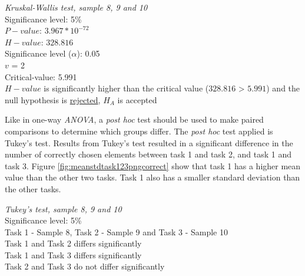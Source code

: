  \begin{center}
	\begin{tcolorbox}[width=0.8\textwidth]
		\centering
		\textit{Kruskal-Wallis test, sample 8, 9 and 10}\\
		Significance level: 5\%  \\[0.5cm]
		
		$P-value$: $3.967* 10^{-72}$ \\
		$H-value$: $328.816$ \\
		Significance level ($\alpha$): 0.05 \\
		$v$ = 2\\ %
		Critical-value:  5.991\\[0.2cm] %
		
		$H-value$ is significantly higher than the critical value ($328.816$ > $5.991$) and the null hypothesis is \underline{rejected}, $H_A$ is accepted\\[0.5cm]
	\end{tcolorbox} 
\end{center}
\vspace{0.3cm}

Like in one-way \textit{ANOVA}, a \textit{post hoc} test should be used to make paired comparisons to determine which groups differ. The \textit{post hoc} test applied is Tukey's test. Results from Tukey's test resulted in a significant difference in the number of correctly chosen elements between task 1 and task 2, and task 1 and task 3. Figure \ref{fig:meanstdtask123pngcorrect} show that task 1 has a higher mean value than the other two tasks. Task 1 also has a smaller standard deviation than the other tasks. \\[0.2cm]

 \begin{center}
	\begin{tcolorbox}[width=0.8\textwidth]
		\centering
		\textit{Tukey's test, sample 8, 9 and 10}\\
		Significance level: 5\%  \\[0.5cm]
		Task 1 - Sample 8, Task 2 - Sample 9 and Task 3 - Sample 10 \\[0.5cm]
		
		Task 1 and Task 2 differs significantly \\
		Task 1 and Task 3 differs significantly \\
		Task 2 and Task 3 do not differ significantly \\[0.2cm]
	\end{tcolorbox} 
\end{center}

